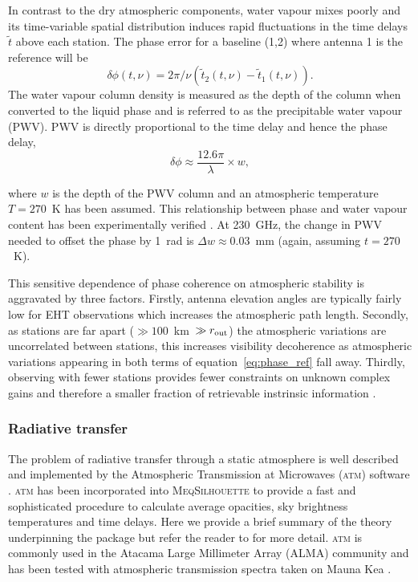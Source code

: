 In contrast to the dry atmospheric components, water vapour mixes poorly and its time-variable spatial distribution induces rapid fluctuations in the time delays $\tilde{t}$ above each station. The phase error for a baseline (1,2) where antenna 1 is the reference will be
\begin{equation}\label{eq:phase_ref}
\delta \phi(t, \nu) = 2\pi/\nu(\tilde{t}_2(t, \nu) - \tilde{t}_1(t, \nu)).
\end{equation}
The water vapour column density is measured as the depth of the column when converted to the liquid phase and is referred to as the precipitable water vapour (PWV). PWV is directly proportional to the time delay and hence the phase delay, 
\begin{equation}
\delta\phi \approx \frac{12.6\pi}{\lambda} \times w, 
\end{equation}\label{eq:phi-pwv}

\noindent where $w$ is the depth of the PWV column \citep*{Carilli_1999} and an atmospheric temperature $T=270$~K has been assumed. This relationship between phase and water vapour content has been experimentally verified \citep{hogg_1981}. At 230~GHz, the change in PWV needed to offset the phase by 1~rad is $\Delta w\approx0.03$~mm (again, assuming $t=270$~K). 

This sensitive dependence of phase coherence on atmospheric stability is aggravated by three factors. Firstly, antenna elevation angles are typically fairly low for EHT observations which increases the atmospheric path length. Secondly, as stations are far apart ($\gg 100$~km~$\gg r_{\rm out}$) the atmospheric variations are uncorrelated between stations, this increases visibility decoherence as atmospheric variations appearing in both terms of equation~\ref{eq:phase_ref} fall away. Thirdly, observing with fewer stations provides fewer constraints on unknown complex gains and therefore a smaller fraction of retrievable instrinsic information \citep{Thompson_2001}.


\subsubsection{Radiative transfer}\label{sec:atm_theory}

The problem of radiative transfer through a static atmosphere is well described and implemented by the Atmospheric Transmission at Microwaves (\textsc{atm}) software \citep{Pardo_2001}. \textsc{atm} has been incorporated into \textsc{MeqSilhouette} to provide a fast and sophisticated procedure to calculate average opacities, sky brightness temperatures and time delays. Here we provide a brief summary of the theory underpinning the package but refer the reader to \citet{Pardo_2001} for more detail. \textsc{atm} is commonly used in the Atacama Large Millimeter Array (ALMA) community \citep[e.g.][]{Curtis_2009,Nikolic_2013} and has been tested with atmospheric transmission spectra taken on Mauna Kea \citep{Serabyn_1998}.

